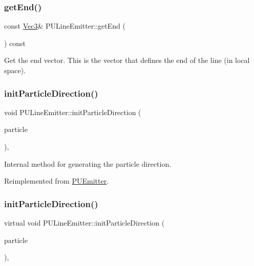 \subsubsection{\texorpdfstring{get\+End()}{getEnd()}\hspace{0.1cm}{\footnotesize\ttfamily [2/2]}}
{\footnotesize\ttfamily const \hyperlink{classVec3}{Vec3}\& P\+U\+Line\+Emitter\+::get\+End (\begin{DoxyParamCaption}\item[{void}]{ }\end{DoxyParamCaption}) const}

Get the end vector. This is the vector that defines the end of the line (in local space). \mbox{\label{classPULineEmitter_a9c2cf66c33150c25e546faf6cf3244aa}} 
\subsubsection{\texorpdfstring{init\+Particle\+Direction()}{initParticleDirection()}\hspace{0.1cm}{\footnotesize\ttfamily [1/2]}}
{\footnotesize\ttfamily void P\+U\+Line\+Emitter\+::init\+Particle\+Direction (\begin{DoxyParamCaption}\item[{\hyperlink{structPUParticle3D}{P\+U\+Particle3D} $\ast$}]{particle }\end{DoxyParamCaption})\hspace{0.3cm}{\ttfamily [override]}, {\ttfamily [virtual]}}

Internal method for generating the particle direction. 

Reimplemented from \hyperlink{classPUEmitter_a0dffa0a17008ddaaec73c6042ea1a019}{P\+U\+Emitter}.

\mbox{\label{classPULineEmitter_a5caf11b317242d3b6b58f99c7a3de0ed}} 
\subsubsection{\texorpdfstring{init\+Particle\+Direction()}{initParticleDirection()}\hspace{0.1cm}{\footnotesize\ttfamily [2/2]}}
{\footnotesize\ttfamily virtual void P\+U\+Line\+Emitter\+::init\+Particle\+Direction (\begin{DoxyParamCaption}\item[{\hyperlink{structPUParticle3D}{P\+U\+Particle3D} $\ast$}]{particle }\end{DoxyParamCaption})\hspace{0.3cm}{\ttfamily [override]}, {\ttfamily [virtual]}}

